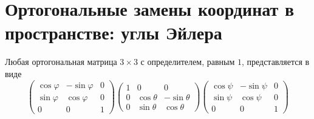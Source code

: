 \section{Ортогональные замены координат в пространстве: углы Эйлера}

\begin{theorem}
    Любая ортогональная матрица $3 \times 3$ с определителем, равным $1$, представляется в виде
    $$
    \begin{pmatrix}
        \cos\varphi & -\sin\varphi & 0\\
        \sin\varphi & \cos\varphi & 0\\
        0 & 0 & 1
    \end{pmatrix}
    \begin{pmatrix}
        1 & 0 & 0\\
        0 & \cos\theta & -\sin\theta\\
        0 & \sin\theta & \cos\theta
    \end{pmatrix}
    \begin{pmatrix}
        \cos\psi & -\sin\psi & 0\\
        \sin\psi & \cos\psi & 0\\
        0 & 0 & 1
    \end{pmatrix}
    $$
\end{theorem}

